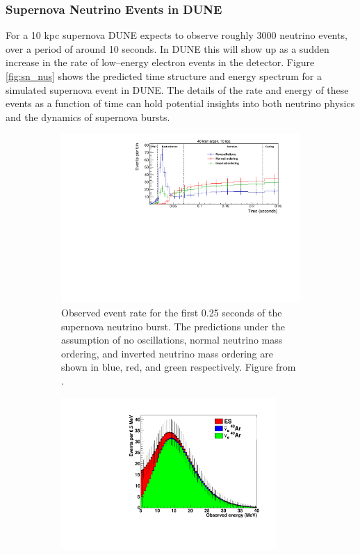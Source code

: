\subsubsection{Supernova Neutrino Events in DUNE}

For a 10 kpc supernova DUNE expects to observe roughly 3000 neutrino events,
over a period of around 10 seconds. In DUNE this will show up as a sudden
increase in the rate of low--energy electron events in the detector. Figure 
\ref{fig:sn_nus} shows the predicted time structure and energy spectrum for a 
simulated supernova event in DUNE\cite{Abi:2020evt}. The details of the rate 
and energy of these events as a function of time can hold potential insights 
into both neutrino physics and the dynamics of supernova bursts. 

\begin{figure}
	\centering
	\begin{subfigure}[b]{\textwidth}
		\includegraphics[width=\textwidth]{figures/sn_time.pdf}
		\caption {Observed event rate for the first 0.25 seconds of the supernova
		neutrino burst. The predictions under the assumption of no oscillations, 
		normal neutrino mass ordering, and inverted neutrino mass ordering are shown 
		in blue, red, and green respectively. Figure from \cite{Abi:2020evt}.}
		\label{fig:sn_time}
	\end{subfigure}
	\begin{subfigure}[b]{\textwidth}
		\centering
		\includegraphics[width=0.9\textwidth]{figures/sn_energy.pdf}

\end{subfigure}
\end{figure}
